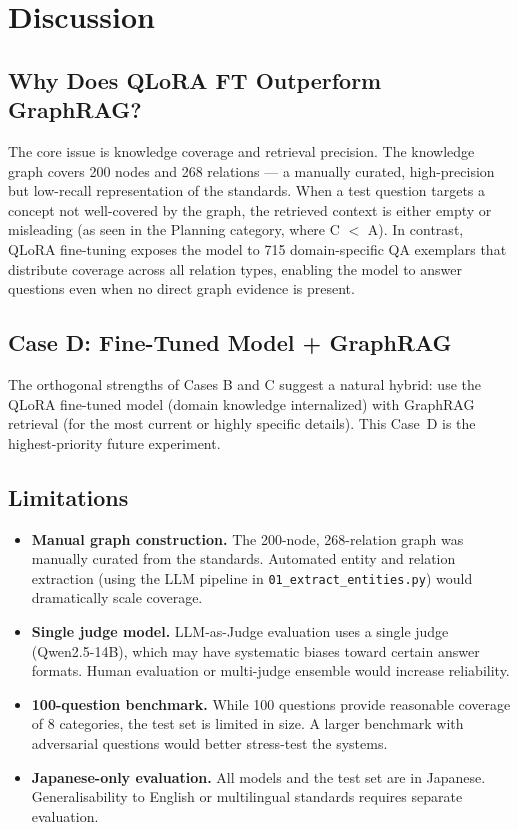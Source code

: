 \documentclass[twocolumn]{article}
\begin{document}
\section{Discussion}
\label{sec:discussion}

\subsection{Why Does QLoRA FT Outperform GraphRAG?}

The core issue is knowledge coverage and retrieval precision.
The knowledge graph covers 200 nodes and 268 relations --- a manually curated,
high-precision but low-recall representation of the standards.
When a test question targets a concept not well-covered by the graph,
the retrieved context is either empty or misleading
(as seen in the Planning category, where C $<$ A).
In contrast, QLoRA fine-tuning exposes the model to 715 domain-specific QA exemplars
that distribute coverage across all relation types,
enabling the model to answer questions even when no direct graph evidence is present.

\subsection{Case D: Fine-Tuned Model + GraphRAG}

The orthogonal strengths of Cases B and C suggest a natural hybrid:
use the QLoRA fine-tuned model (domain knowledge internalized) with GraphRAG retrieval
(for the most current or highly specific details).
This Case~D is the highest-priority future experiment.

\subsection{Limitations}

\begin{itemize}
  \item \textbf{Manual graph construction.}
        The 200-node, 268-relation graph was manually curated from the standards.
        Automated entity and relation extraction (using the LLM pipeline in
        \texttt{01\_extract\_entities.py}) would dramatically scale coverage.
  \item \textbf{Single judge model.}
        LLM-as-Judge evaluation uses a single judge (Qwen2.5-14B), which may have
        systematic biases toward certain answer formats.
        Human evaluation or multi-judge ensemble would increase reliability.
  \item \textbf{100-question benchmark.}
        While 100 questions provide reasonable coverage of 8 categories,
        the test set is limited in size.
        A larger benchmark with adversarial questions would better stress-test the systems.
  \item \textbf{Japanese-only evaluation.}
        All models and the test set are in Japanese.
        Generalisability to English or multilingual standards requires separate evaluation.
\end{itemize}
\end{document}
